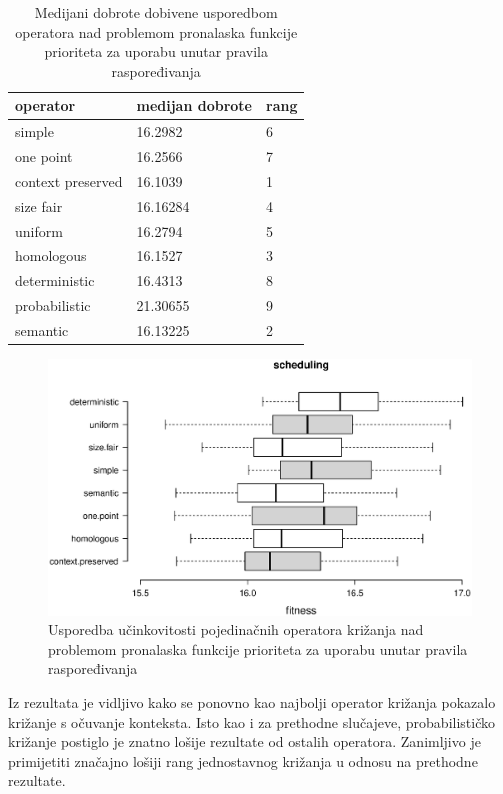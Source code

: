 \begin{table}[H]
 	\centering

    \caption{Medijani dobrote dobivene usporedbom operatora nad problemom pronalaska funkcije prioriteta za uporabu unutar pravila raspoređivanja}
    \begin{tabular}{| l | l | l |}
    \hline
    \textbf{operator} & \textbf{medijan dobrote} & \textbf{rang}\\ \hline
    simple & 16.2982 & 6\\ \hline
    one point & 16.2566 & 7\\ \hline
    context preserved & 16.1039 & 1\\ \hline
    size fair & 16.16284 & 4\\ \hline
    uniform & 16.2794 & 5\\ \hline
    homologous & 16.1527 & 3\\ \hline
    deterministic & 16.4313 & 8\\ \hline
    probabilistic & 21.30655 & 9\\ \hline
    semantic & 16.13225 & 2\\ \hline
    \end{tabular}
    
    \label{iprojekttable}
\end{table}

\begin{figure}[H]
	\centering
	\includegraphics[trim=0cm 4cm 0cm 1cm, scale=0.6]{./slike/boxPlots/iprojekt.eps}
	\caption{Usporedba učinkovitosti pojedinačnih operatora križanja nad problemom pronalaska funkcije prioriteta za uporabu unutar pravila raspoređivanja}
	\label{iprojektBox}
\end{figure}

Iz rezultata je vidljivo kako se ponovno kao najbolji operator križanja pokazalo križanje s očuvanje konteksta. Isto kao i za prethodne slučajeve, probabilističko križanje postiglo je znatno lošije rezultate od ostalih operatora. Zanimljivo je primijetiti značajno lošiji rang jednostavnog križanja u odnosu na prethodne rezultate.


